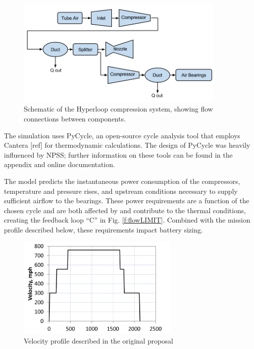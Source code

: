 \documentclass[heading.tex]{subfiles}
\begin{document}
\begin{figure}[hbtp]
\centering
\includegraphics[width=0.9\textwidth]{images/compressor_schematic.png}
\caption{Schematic of the Hyperloop compression system, showing flow connections between components.}
\label{f:comp}
\end{figure}


The simulation uses PyCycle, an open-source cycle analysis tool that employs Cantera [ref] for thermodynamic calculations. The design of PyCycle was heavily influenced by NPSS;
further information on these tools can be found in the appendix and online documentation. \cite{goodwin2009cantera}

The model predicts the instantaneous power consumption of the compressors, temperature and pressure rises,
and upstream conditions necessary to supply sufficient airflow to the bearings.
These power requirements are a function of the chosen cycle and are both affected by
and contribute to the thermal conditions, creating the feedback loop “C” in Fig. \ref{f:flowLIMIT}.
Combined with the mission profile described below, these requirements impact battery sizing.

\begin{figure}[hbtp]
\centering
\includegraphics[width=0.7\textwidth]{images/velocity_profile.png}
\caption{Velocity profile described in the original proposal}
\label{f:velocity}
\end{figure}
\end{document}
